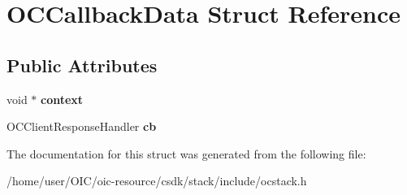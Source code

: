 \hypertarget{structOCCallbackData}{}\section{O\+C\+Callback\+Data Struct Reference}
\label{structOCCallbackData}
\subsection*{Public Attributes}
\begin{DoxyCompactItemize}
\item 
\hypertarget{structOCCallbackData_a21d99e3c61b34603929bb3ccb6d4e4a1}{}void $\ast$ {\bfseries context}\label{structOCCallbackData_a21d99e3c61b34603929bb3ccb6d4e4a1}

\item 
\hypertarget{structOCCallbackData_a77219e4eb938d047a96dd8d9d4a283d7}{}O\+C\+Client\+Response\+Handler {\bfseries cb}\label{structOCCallbackData_a77219e4eb938d047a96dd8d9d4a283d7}

\end{DoxyCompactItemize}


The documentation for this struct was generated from the following file\+:\begin{DoxyCompactItemize}
\item 
/home/user/\+O\+I\+C/oic-\/resource/csdk/stack/include/ocstack.\+h\end{DoxyCompactItemize}
